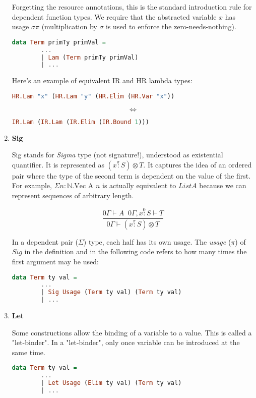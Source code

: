 \documentclass[acmsmall]{acmart}
\numberwithin{figure}{subsection}
\begin{document}
\begin{enumerate}
    Forgetting the resource annotations, this is the standard introduction rule for dependent function types. We require that the abstracted variable $x$ has usage $\sigma \pi$ (multiplication by $\sigma$ is used to enforce the zero-needs-nothing).

    \begin{lstlisting}[language=haskell]
data Term primTy primVal = 
        ...
        | Lam (Term primTy primVal)
        | ...
    \end{lstlisting}


    Here's an example of equivalent IR and HR lambda types:

    \begin{lstlisting}[language=haskell]
        HR.Lam "x" (HR.Lam "y" (HR.Elim (HR.Var "x"))
    \end{lstlisting}
    \begin{equation*}
      \Leftrightarrow  
    \end{equation*}
    \begin{lstlisting}[language=haskell]
        IR.Lam (IR.Lam (IR.Elim (IR.Bound 1)))
    \end{lstlisting}

    \item \textbf{Sig}

    Sig stands for \textit{Sigma} type (not signature!), understood as existential quantifier. It is represented as $(x \stackrel{\pi}{:} S) \otimes T$. It captures the idea of an ordered pair where the type of the second term is dependent on the value of the first. For example, $\Sigma n : \mathbb{N}. \text{Vec A } n$ is actually equivalent to $List A$ because we can represent sequences of arbitrary length.

    \begin{equation*}
        \dfrac{0\Gamma \vdash A \; \; 0\Gamma, x \stackrel{0}{:} S \vdash T}{0\Gamma \vdash (x \stackrel{\pi}{:} S) \otimes T}
    \end{equation*}

    In a dependent pair ($\Sigma$) type, each half has its own usage. The \textit{usage} ($\pi$) of $Sig$ in the definition and in the following code refers to how many times the first argument may be used:

    \begin{lstlisting}[language=haskell]
data Term ty val = 
        ...
        | Sig Usage (Term ty val) (Term ty val)
        | ...
    \end{lstlisting}

    \item \textbf{Let}
    
    Some constructions allow the binding of a variable to a value. This is called a "let-binder". In a "let-binder", only once variable can be introduced at the same time.

    \begin{lstlisting}[language=haskell]
data Term ty val = 
        ...
        | Let Usage (Elim ty val) (Term ty val)
        | ...
    \end{lstlisting}
\end{enumerate}
\end{document}
